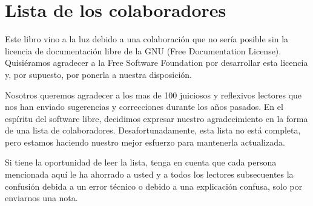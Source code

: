 
\chapter{Lista de los colaboradores}

Este libro vino a la luz debido a una colaboración que no sería posible
sin la licencia de documentación libre de la GNU (Free Documentation
License). Quisiéramos agradecer a la Free Software Foundation por
desarrollar esta licencia y, por supuesto, por ponerla a nuestra disposición.

Nosotros queremos agradecer a los mas de 100 juiciosos y reflexivos
lectores que nos han enviado sugerencias y correcciones durante los
años pasados. En el espíritu del software libre, decidimos expresar
nuestro agradecimiento en la forma de una lista de colaboradores.
Desafortunadamente, esta lista no está completa, pero estamos haciendo
nuestro mejor esfuerzo para mantenerla actualizada.

Si tiene la oportunidad de leer la lista, tenga en cuenta que cada
persona mencionada aquí le ha ahorrado a usted y a todos los lectores
subsecuentes la confusión debida a un error técnico o debido a una
explicación confusa, solo por enviarnos una nota.


